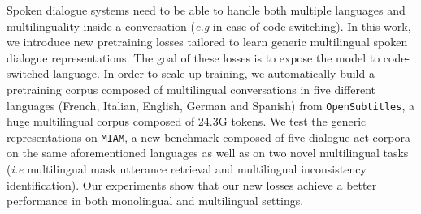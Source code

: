 Spoken dialogue systems need to be able to handle both multiple languages and multilinguality inside a conversation (\textit{e.g} in case of code-switching). In this work, we introduce new pretraining losses tailored to learn generic multilingual spoken dialogue representations. The goal of these losses is to expose the model to code-switched language. In order to scale up training, we automatically build a pretraining corpus composed of multilingual conversations in five different languages (French, Italian, English, German and Spanish) from \texttt{OpenSubtitles}, a huge multilingual corpus composed of 24.3G tokens. We test the generic representations on \texttt{MIAM}, a new benchmark composed of five dialogue act corpora on the same aforementioned languages as well as on two novel multilingual tasks (\textit{i.e} multilingual mask utterance retrieval and multilingual inconsistency identification). Our experiments show that our new losses achieve a better performance in both monolingual and multilingual settings.
